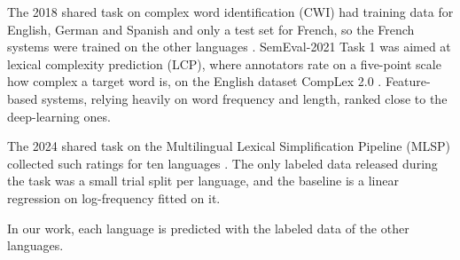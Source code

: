 \documentclass[11pt]{article}
\begin{document}
The 2018 shared task on complex word identification (CWI) had training data for English, German %
and Spanish and only a test set for French, so the French systems were trained on the other %
languages \citep{yimam-etal-2018-report}. SemEval-2021 Task 1 was aimed at lexical complexity %
prediction (LCP), where annotators rate on a five-point scale how complex a target word is, on the
English dataset CompLex 2.0 \citep{shardlow-etal-2021-semeval}. Feature-based systems, relying %
heavily on word frequency and length, ranked close to the deep-learning ones.

The 2024 shared task on the Multilingual Lexical Simplification Pipeline (MLSP) collected such %
ratings for ten languages \citep{shardlow-etal-2024-bea}. The only labeled data released during %
the task was a small trial split per language, and the baseline is a linear regression on %
log-frequency fitted on it. 

In our work, each language is predicted with the labeled
data of the other languages. 
\end{document}
